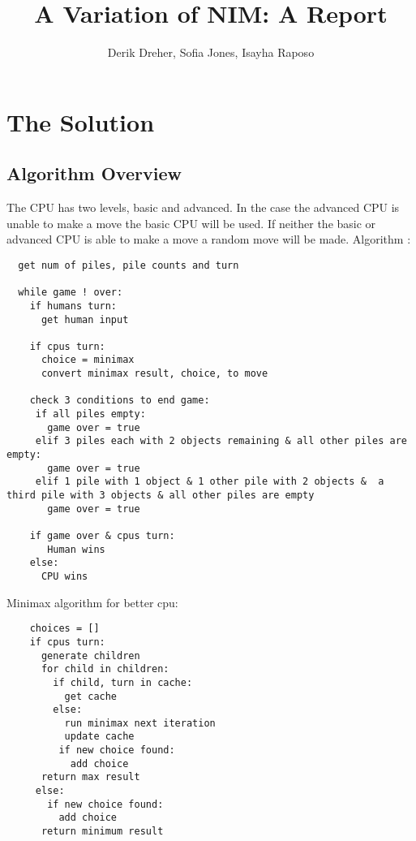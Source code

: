\documentclass{article}
\begin{document}
\begin{titlepage}
\title{A Variation of NIM: A Report}
\author{Derik Dreher, Sofia Jones, Isayha Raposo}
\maketitle
\thispagestyle{empty}
\end{titlepage}

\rhead{\today}

\section*{The Solution}
\subsection*{Algorithm Overview}
The CPU has two levels, basic and advanced. In the case the advanced CPU is unable to make a move the basic CPU will be used. If neither the basic or advanced CPU is able to make a move a random move will be made.
Algorithm :
\begin{verbatim}
  get num of piles, pile counts and turn
  
  while game ! over:
    if humans turn:
      get human input
      
    if cpus turn: 
      choice = minimax
      convert minimax result, choice, to move 
      
    check 3 conditions to end game:
     if all piles empty:
       game over = true
     elif 3 piles each with 2 objects remaining & all other piles are empty:
       game over = true
     elif 1 pile with 1 object & 1 other pile with 2 objects &  a third pile with 3 objects & all other piles are empty
       game over = true
       
    if game over & cpus turn:
       Human wins
    else:
      CPU wins
\end{verbatim}

Minimax algorithm for better cpu:
\begin{verbatim}
    choices = []
    if cpus turn: 
      generate children
      for child in children:
        if child, turn in cache:
          get cache
        else: 
          run minimax next iteration
          update cache
         if new choice found:
           add choice
      return max result
     else:
       if new choice found:
         add choice
      return minimum result
\end{verbatim}
\end{document}
